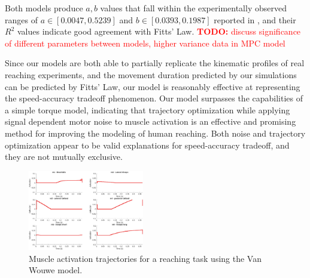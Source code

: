 \documentclass[letterpaper, 10pt, conference]{ieeeconf}
\newcommand{\todo}[1]{\textcolor{red}{\textbf{TODO:} #1}}
\begin{document}
Both models produce $a,b$ values that fall within the experimentally observed ranges of $a \in [0.0047, 0.5239]$ and $b \in [0.0393,0.1987]$ reported in \cite{fitts_law_exp_data}, and their $R^2$ values indicate good agreement with Fitts' Law.
\todo{discuss significance of different parameters between models, higher variance data in MPC model}


Since our models are both able to partially replicate the kinematic profiles of real reaching experiments, and the movement duration predicted by our simulations can be predicted by Fitts' Law, our model is reasonably effective at representing the speed-accuracy tradeoff phenomenon.
Our model surpasses the capabilities of a simple torque model, indicating that trajectory optimization while applying signal dependent motor noise to muscle activation is an effective and promising method for improving the modeling of human reaching.
Both noise and trajectory optimization appear to be valid explanations for speed-accuracy tradeoff, and they are not mutually exclusive.

\begin{figure}[h]
    \centering
    \includegraphics[width=0.45\textwidth]{images/demo_activations_small.jpg}
    \caption{Muscle activation trajectories for a reaching task using the Van Wouwe model.}
    \label{fig:demo_activations}
\end{figure}
\end{document}
